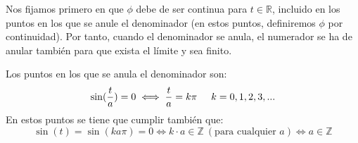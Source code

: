 \documentclass[openany]{book}
\begin{document}
\begin{exercise}
    $  $\\ 
    Nos fijamos primero en que $ \phi $ debe de ser continua para $ t \in \mathbb{R} $, incluido en los puntos en los que se anule el denominador (en estos puntos, definiremos $\phi$ por continuidad). Por tanto, cuando el denominador se anula, el numerador se ha de anular también para que exista el límite y sea finito. 

    Los puntos en los que se anula el denominador son:
    $$ \sin(\dfrac{t}{a}) = 0 \iff \dfrac{t}{a} = k \pi \hspace{5mm} k = 0,1,2,3,... $$
    En estos puntos se tiene que cumplir también que:
    $$ \sin(t) = \sin(k a \pi) = 0 \iff k\cdot a \in \mathbb{Z}\ ( \text{para cualquier }a) \iff a \in \mathbb{Z} $$
\end{exercise}
\end{document}
